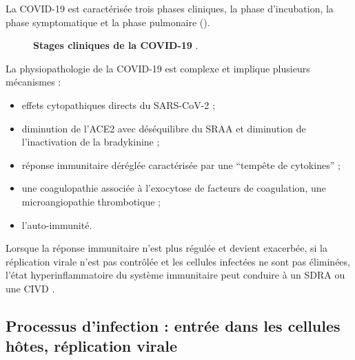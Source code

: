 \documentclass[
  a4paper,
  DIV=11,
  numbers=noendperiod,
  listof=totoc]{scrreprt}
\providecommand{\tightlist}{%
  \setlength{\itemsep}{0pt}\setlength{\parskip}{0pt}}\usepackage{longtable,booktabs,array}
\begin{document}
La \ac{COVID-19} est caractérisée trois phases cliniques, la phase
d'incubation, la phase symptomatique et la phase pulmonaire
().

\begin{figure}


\caption[Stages cliniques de la
COVID-19.]{\label{fig-clinical-stage}\textbf{Stages cliniques de la
COVID-19} \autocite{Marik.2021}.}

\end{figure}%

La physiopathologie de la COVID-19 est complexe et implique plusieurs
mécanismes \autocite{Eijk.2021} :

\begin{itemize}
\tightlist
\item
  effets cytopathiques directs du SARS-CoV-2 ;
\item
  diminution de l'\ac{ACE2} avec déséquilibre du \ac{SRAA} et diminution
  de l'inactivation de la bradykinine ;
\item
  réponse immunitaire déréglée caractérisée par une ``tempête de
  cytokines'' ;
\item
  une coagulopathie associée à l'exocytose de facteurs de coagulation,
  une microangiopathie thrombotique ;
\item
  l'auto-immunité.
\end{itemize}

Lorsque la réponse immunitaire n'est plus régulée et devient exacerbée,
si la réplication virale n'est pas contrôlée et les cellules infectées
ne sont pas éliminées, l'état hyperinflammatoire du système immunitaire
peut conduire à un \ac{SDRA} ou une \ac{CIVD}
\autocite{Contreras-Bolívar.2023}.

\subsection{Processus d'infection : entrée dans les cellules hôtes,
réplication
virale}\label{processus-dinfection-entruxe9e-dans-les-cellules-huxf4tes-ruxe9plication-virale}
\end{document}
